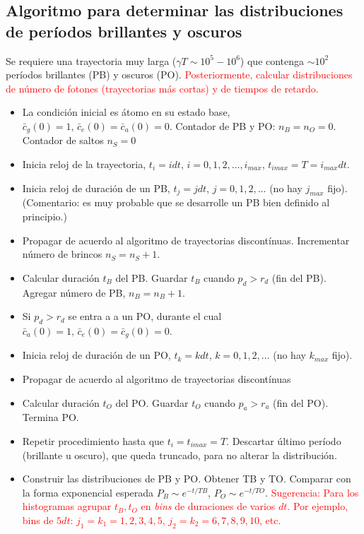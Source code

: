 \documentclass[twocolumn,aps,eqsecnum,showkeys,amsmath]{revtex4}
\begin{document}
\subsection{Algoritmo para determinar las distribuciones de per\'iodos 
brillantes y oscuros}
Se requiere una trayectoria muy larga ($\gamma T \sim 10^5 - 10^6$) 
que contenga $\sim 10^2$ per\'iodos brillantes (PB) y oscuros (PO).
\textcolor{red}{
Posteriormente, calcular distribuciones de n\'umero de fotones 
(trayectorias m\'as cortas) y de tiempos de retardo.}  
%
\begin{itemize}
\item La condici\'on inicial es \'atomo en su estado base, 
$\bar{c}_g (0) =1, \, \bar{c}_e (0) = \bar{c}_a (0) =0$. Contador de 
PB y PO: $n_B = n_O =0$. Contador de saltos $n_S=0$
%
\item Inicia reloj de la trayectoria, $t_i=idt$, $i=0,1,2,\ldots,i_{max}$, 
$t_{imax} = T = i_{max} dt$. 
%
\item Inicia reloj de duraci\'on de un PB, $t_j = jdt$, $j=0,1,2,\ldots$ 
(no hay $j_{max}$ fijo). (Comentario: es muy probable que se desarrolle 
un PB bien definido al principio.) 
%
\item Propagar de acuerdo al algoritmo de trayectorias discont\'inuas.   
Incrementar n\'umero de brincos $n_S = n_S +1$. 
%
\item Calcular duraci\'on $t_B$ del PB. Guardar $t_B$ cuando 
$p_d > r_d$ (fin del PB). Agregar n\'umero de PB, $n_B = n_B+1$. 
%
\item Si $p_d > r_d$ se entra a a un PO, durante el cual 
$\bar{c}_a (0) =1, \, \bar{c}_e (0) = \bar{c}_g (0) =0$. 
%
\item Inicia reloj de duraci\'on de un PO, $t_k = kdt$, $k=0,1,2,\ldots$ 
(no hay $k_{max}$ fijo).
%
\item Propagar de acuerdo al algoritmo de trayectorias discont\'inuas   
%
\item Calcular duraci\'on $t_O$ del PO. Guardar $t_O$ cuando 
$p_a > r_a$ (fin del PO). Termina PO. 
%
\item Repetir procedimiento hasta que $t_i = t_{imax} =T$. 
Descartar \'ultimo per\'iodo (brillante u oscuro), que queda truncado, 
para no alterar la distribuci\'on. 
%
\item Construir las distribuciones de PB y PO. Obtener TB y TO. 
Comparar con la forma exponencial esperada $P_B \sim e^{-t/TB}$, 
$P_O \sim e^{-t/TO}$. \textcolor{red}{Sugerencia: Para los histogramas 
agrupar $t_B, t_O$ en \textit{bins} de duraciones de varios $dt$. Por 
ejemplo, bins de $5dt$: $j_1=k_1=1,2,3,4,5$, $j_2=k_2=6,7,8,9,10$, etc.}
\end{itemize}
\end{document}

